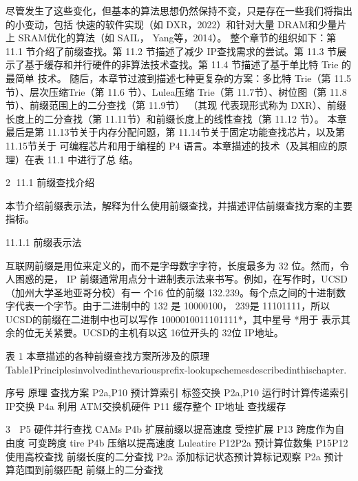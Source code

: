 尽管发生了这些变化，但基本的算法思想仍然保持不变，只是存在一些我们将指出的小变动，包括
快速的软件实现（如 DXR，2022）和针对大量 DRAM和少量片上 SRAM优化的算法（如 SAIL，
Yang等，2014）。
整个章节的组织如下：第 11.1 节介绍了前缀查找。第 11.2 节描述了减少 IP查找需求的尝试。第
11.3 节展示了基于缓存和并行硬件的非算法技术查找。第 11.4 节描述了基于单比特 Trie 的最简单
技术。
   随后，本章节过渡到描述七种更复杂的方案：多比特 Trie（第 11.5节）、层次压缩Trie（第 11.6
 节）、Lulea压缩 Trie（第 11.7节）、树位图（第 11.8节）、前缀范围上的二分查找（第 11.9节）
                                                      （其现
代表现形式称为 DXR）、前缀长度上的二分查找（第 11.11节）和前缀长度上的线性查找（第 11.12
节）。
本章最后是第 11.13节关于内存分配问题，第 11.14节关于固定功能查找芯片，以及第 11.15节关于
可编程芯片和用于编程的 P4 语言。本章描述的技术（及其相应的原理）在表 11.1 中进行了总
结。




                                                         2
11.1 前缀查找介绍

本节介绍前缀表示法，解释为什么使用前缀查找，并描述评估前缀查找方案的主要指标。



11.1.1 前缀表示法

互联网前缀是用位来定义的，而不是字母数字字符，长度最多为 32 位。然而，令人困惑的是，
IP 前缀通常用点分十进制表示法来书写。例如，在写作时，UCSD（加州大学圣地亚哥分校）有一
个16 位的前缀 132.239。每个点之间的十进制数字代表一个字节。由于二进制中的 132 是
10000100，
239是 11101111，所以 UCSD的前缀在二进制中也可以写作 1000010011101111*，其中星号 *用于
表示其余的位无关紧要。UCSD的主机有以这 16位开头的 32位 IP地址。



                     表 1 本章描述的各种前缀查找方案所涉及的原理
   Table1Principlesinvolvedinthevariousprefix-lookupschemesdescribedinthischapter.

      序号                    原理                             查找方案
     P2a,P10               预计算索引                           标签交换
     P2a,P10         运行时计算传递索引                              IP交换
       P4a           利用 ATM交换机硬件
       P11               缓存整个 IP地址                         查找缓存

                                                                                     3
       P5         硬件并行查找               CAMs
      P4b        扩展前缀以提高速度           受控扩展
       P13        跨度作为自由度    可变跨度 tire
      P4b         压缩以提高速度    Luleatire
     P12P2a       预计算位数集
     P15P12       使用高校查找         前缀长度的二分查找
      P2a      添加标记状态预计算标记观察
      P2a       预计算范围到前缀匹配          前缀上的二分查找

